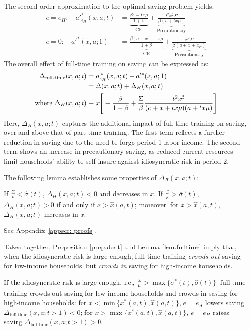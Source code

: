 \documentclass[12pt,english]{article}
\makeatletter
\numberwithin{equation}{section}
\renewenvironment{proof}[1][\proofname]{\par
    \pushQED{\qed}%
    \normalfont \topsep2\p@\@plus6\p@\relax
    \trivlist
    \item\relax
    {\itshape #1\@addpunct{.}}\hspace\labelsep\ignorespaces
}{%
    \popQED\endtrivlist\@endpefalse
}
\makeatother
\begin{document}
The second-order approximation to the optimal saving problem yields:
\begin{align}
    e = e_H: \quad a'^*_{e_H}(x,a;t) &= \underbrace{\frac{\beta a - t x \mu}{1+\beta}}_{\text{CE}} + \underbrace{\frac{t^2 x^2 \Sigma}{\beta(a + t x \mu)}}_{\text{Precautionary}} \\
    e = 0: \quad a'^*(x,a;1) &= \underbrace{\frac{\beta(a + x) - x \mu}{1+\beta}}_{\text{CE}} + \underbrace{\frac{x^2 \Sigma}{\beta(a + x + x \mu)}}_{\text{Precautionary}}
\end{align} 
The overall effect of full-time training on saving can be expressed as:
\begin{align}
    \Delta_{\text{full-time}}(x,a;t) &= a'^*_{e_H}(x,a;t) - a'^*(x,a;1) \notag \\
    &= \Delta(x,a;t) + \Delta_H(x,a;t) \\
    \text{where } \Delta_H(x,a;t) &\equiv x \Bigg[ -\frac{\beta}{1+\beta} + \frac{\Sigma}{\beta} \frac{t^2 x^2}{(a + x + t x \mu)(a + t x \mu)} \Bigg] \label{eq:dadt_fulltime}
\end{align}
Here, $\Delta_H(x,a;t)$ captures the additional impact of full-time training on saving, over and above that of part-time training. The first term reflects a further reduction in saving due to the need to forgo period-1 labor income. The second term shows an increase in precautionary saving, as reduced current resources limit households’ ability to self-insure against idiosyncratic risk in period 2.

The following lemma establishes some properties of $\Delta_H(x,a;t)$:
\begin{lemma}\label{lem:fulltime}
    If $\frac{\Sigma}{\mu}<\hat{\sigma}(t)$, $\Delta_H(x,a;t)<0$ and decreases in $x$. If $\frac{\Sigma}{\mu}>\overline{\sigma}(t)$, $\Delta_H(x,a;t)>0$ if and only if $x>\hat{x}(a,t)$; moreover, for $x>\hat{x}(a,t)$, $\Delta_H(x,a;t)$ increases in $x$.
\end{lemma}
\begin{proof}
    See Appendix~\ref{appsec: proofs}.
\end{proof}

\noindent Taken together, Proposition \ref{prop:dadt} and Lemma \ref{lem:fulltime} imply that, when the idiosyncratic risk is large enough, full-time training \textit{crowds out} saving for low-income households, but \textit{crowds in} saving for high-income households.
\begin{proposition}\label{prop:fulltime}
If the idiosyncratic risk is large enough, i.e., $\frac{\Sigma}{\mu}>\max\{\sigma^*(t),\hat{\sigma}(t)\}$, full-time training crowds out saving for low-income households and crowds in saving for high-income households: 
    for $x<\min\{x^*(a,t),\hat{x}(a,t)\}$, $e=e_H$ lowers saving $\Delta_{\text{full-time}}(x,a;t>1)<0$; for $x>\max\{x^*(a,t),\hat{x}(a,t)\}$, $e=e_H$ raises saving $\Delta_{\text{full-time}}(x,a;t>1)>0$.
\end{proposition}
\end{document}
